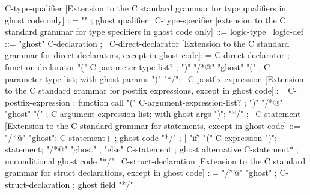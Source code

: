 \begin{syntax}

  C-type-qualifier [Extension to the C  standard grammar for type qualifiers in ghost code only] ::= "\ghost" ; ghost qualifier
  \
  C-type-specifier [extension to the C  standard grammar for type specifiers in ghost code only] ::=
    {logic-type}
  \
  logic-def ::= "ghost" C-declaration ;
  \
  C-direct-declarator [Extension to the C  standard grammar for direct declarators, except in ghost code]::=
      C-direct-declarator ; function declarator
      "(" C-parameter-type-list? ;
      ")" "/*@" "ghost" "(" ;
          C-parameter-type-list; with ghost params
      ")" "*/";
  \
  C-postfix-expression [Extension to the C  standard grammar for postfix expressions, except in ghost code]::=
      C-postfix-expression ; function call
      "(" C-argument-expression-list? ;
       ")" "/*@" "ghost" "(" ;
           C-argument-expression-list; with ghost args
       ")";
      "*/" ;
   \
  C-statement [Extension to the C  standard grammar for statements, except in ghost code] ::=
      "/*@" "ghost";
            C-statement+ ; ghost code
      "*/" ;
    | "if" "(" C-expression ")";
       statement;
       "/*@" "ghost" ;
             "else" C-statement ; ghost alternative
        C-statement* ; unconditional ghost code
      "*/"
  \
  C-struct-declaration [Extension to the C  standard grammar for struct declarations, except in ghost code] ::=
    {"/*@" "ghost" };
          {C-struct-declaration} ; ghost field
    {"*/"}
\end{syntax}


